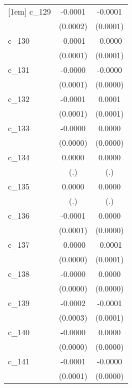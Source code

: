 {\begin{tabular}{l*{2}{c}}
[1em]
c\_129       &     -0.0001        &     -0.0001        \\
            &    (0.0002)        &    (0.0001)        \\
[1em]
c\_130       &     -0.0001        &     -0.0000        \\
            &    (0.0001)        &    (0.0001)        \\
[1em]
c\_131       &     -0.0000        &     -0.0000        \\
            &    (0.0001)        &    (0.0000)        \\
[1em]
c\_132       &     -0.0001        &      0.0001        \\
            &    (0.0001)        &    (0.0001)        \\
[1em]
c\_133       &     -0.0000        &      0.0000        \\
            &    (0.0000)        &    (0.0000)        \\
[1em]
c\_134       &      0.0000        &      0.0000        \\
            &         (.)        &         (.)        \\
[1em]
c\_135       &      0.0000        &      0.0000        \\
            &         (.)        &         (.)        \\
[1em]
c\_136       &     -0.0001        &      0.0000        \\
            &    (0.0001)        &    (0.0000)        \\
[1em]
c\_137       &     -0.0000        &     -0.0001        \\
            &    (0.0000)        &    (0.0001)        \\
[1em]
c\_138       &     -0.0000        &      0.0000        \\
            &    (0.0000)        &    (0.0000)        \\
[1em]
c\_139       &     -0.0002        &     -0.0001        \\
            &    (0.0003)        &    (0.0001)        \\
[1em]
c\_140       &     -0.0000        &      0.0000        \\
            &    (0.0000)        &    (0.0000)        \\
[1em]
c\_141       &     -0.0001        &     -0.0000        \\
            &    (0.0001)        &    (0.0000)        \\

\end{tabular}}
